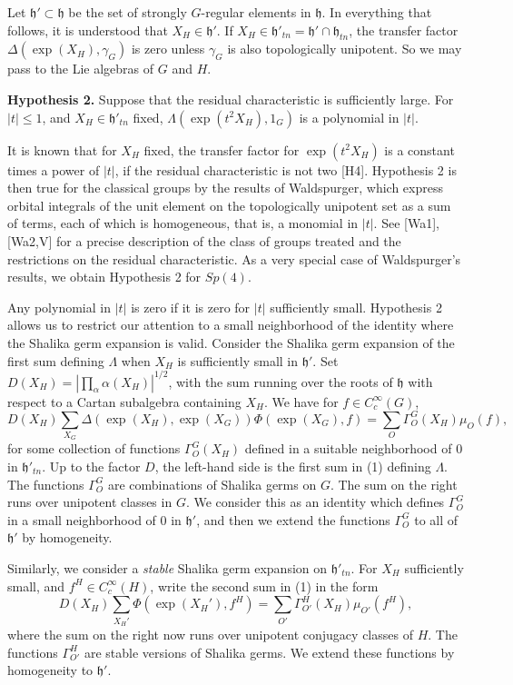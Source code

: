 \documentclass{amsart}
\newcommand\h{{\mathfrak h}}
\begin{document}
Let $\h'\subset \h$ be the set of strongly $G$-regular elements
in $\h$.  In everything that follows, it is understood
that $X_H\in \h'$.  
If $X_H\in \h'_{tn} = \h'\cap \h_{tn}$, the
transfer factor
$\Delta(\exp(X_H),\gamma_G)$ is zero unless $\gamma_G$ is
also topologically unipotent.  So we may pass to the
Lie algebras of $G$ and $H$.

{\bf Hypothesis 2.}  Suppose that the residual characteristic is
sufficiently large.  For $|t|\le 1$, and $X_H\in \h'_{tn}$ fixed,
$\Lambda(\exp(t^2 X_H),1_G)$ is
a polynomial in $|t|$. 

It is known that for $X_H$ fixed, the transfer factor 
for $\exp(t^2 X_H)$ is a constant
times a power of $|t|$, if the residual characteristic is not two [H4].
Hypothesis 2 is then true for the classical groups by the results
of Waldspurger, which express orbital integrals 
of the unit element on the topologically
unipotent set as a sum of terms, each of which is homogeneous, that is,
a monomial in $|t|$.  See [Wa1], [Wa2,V]
 for a precise description of the
class of groups treated and the restrictions on the residual characteristic.
As a very special case of Waldspurger's results, 
we obtain Hypothesis
2 for $Sp(4)$.

Any polynomial in $|t|$ is zero if it is zero for $|t|$ sufficiently
small.  Hypothesis 2 allows us to restrict our attention to a small
neighborhood of the identity where the Shalika germ expansion is valid. 
Consider the Shalika germ expansion of the first sum defining $\Lambda$ when $X_H$ is sufficiently small in $\h'$.
Set $D(X_H) = |\prod_\alpha \alpha(X_H)|^{1/2}$, with the
sum running over the roots of $\h$ with respect to a Cartan
subalgebra containing $X_H$.
We have for $f\in C_c^\infty(G)$,
$$D(X_H)\sum_{X_G} \Delta(\exp(X_H),\exp(X_G))\Phi(\exp(X_G),f)=
 \sum_{O} \Gamma^G_O(X_H)\mu_O(f),$$
for some collection
of functions $\Gamma_{O}^G(X_H)$ defined in a suitable
neighborhood of $0$ in
$\h'_{tn}$.  Up to the factor $D$, 
the left-hand side is the first sum in (1) defining
$\Lambda$.
The functions $\Gamma^G_O$ are combinations
of Shalika germs on $G$.
The sum on the right runs over unipotent
classes in $G$.  We consider this as an identity which
defines $\Gamma_O^G$ in a small neighborhood of $0$ in $\h'$,
and then we extend the functions $\Gamma_O^G$ to all of $\h'$ by homogeneity.

Similarly, we consider a {\it stable} Shalika germ expansion 
on $\h'_{tn}$.  For $X_H$ sufficiently small, 
and $f^H\in C_c^\infty(H)$, write the second sum in (1) in the form
$$D(X_H)\sum_{X_H'} \Phi(\exp(X_H'),f^H) = \sum_{O'}
\Gamma_{O'}^H (X_H)\mu_{O'} (f^H),$$
where the sum on the right
now runs over unipotent conjugacy classes of $H$.
The functions $\Gamma_{O'}^H$ are stable versions of
Shalika germs.
We extend these functions by homogeneity to $\h'$.
\end{document}
